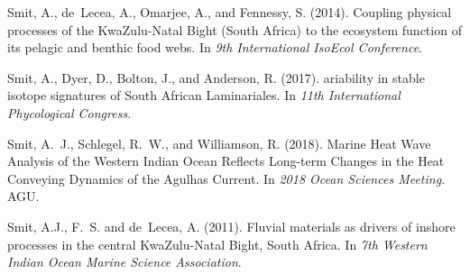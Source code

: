 \begin{thebibliography}{}
  Smit, A., de~Lecea, A., Omarjee, A., and Fennessy, S. (2014).
  \newblock Coupling physical processes of the {K}wa{Z}ulu-{N}atal {B}ight
    ({S}outh {A}frica) to the ecosystem function of its pelagic and benthic food
    webs.
  \newblock In {\em 9th International IsoEcol Conference}.
  
  Smit, A., Dyer, D., Bolton, J., and Anderson, R. (2017).
  ariability in stable isotope signatures of {S}outh {A}frican
    {L}aminariales.
  \newblock In {\em 11th International Phycological Congress}.
  
  Smit, A.~J., Schlegel, R.~W., and Williamson, R. (2018).
   {M}arine {H}eat {W}ave {A}nalysis of the {W}estern {I}ndian
    {O}cean {R}eflects {L}ong-term {C}hanges in the {H}eat {C}onveying {D}ynamics
    of the {A}gulhas {C}urrent.
  \newblock In {\em 2018 Ocean Sciences Meeting}. AGU.
  
  Smit, A.J., F.~S. and de~Lecea, A. (2011).
  \newblock Fluvial materials as drivers of inshore processes in the central
    {K}wa{Z}ulu-{N}atal {B}ight, {S}outh {A}frica.
  \newblock In {\em 7th Western Indian Ocean Marine Science Association}.
  
  \end{thebibliography}
  